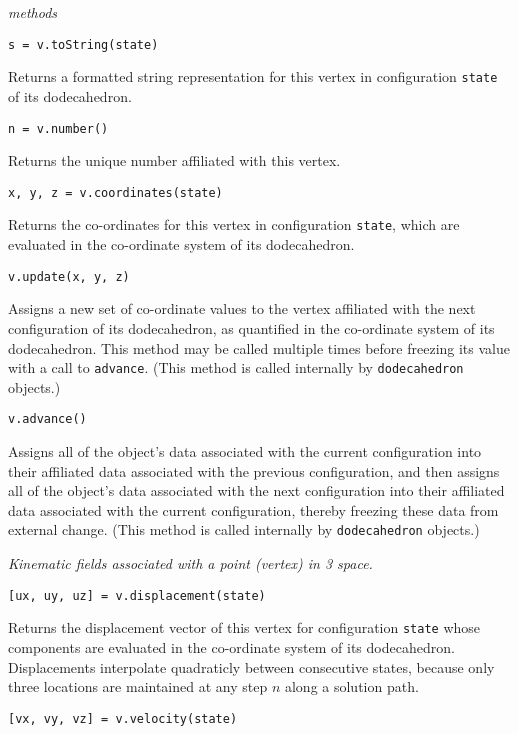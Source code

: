 \medskip\noindent
\textit{methods}

\medskip\noindent
\texttt{s = v.toString(state)}

\medskip\noindent 
Returns a formatted string representation for this vertex in configuration \texttt{state} of its dodecahedron.

\medskip\noindent
\texttt{n = v.number()} 

\medskip\noindent 
Returns the unique number affiliated with this vertex.

\medskip\noindent
\texttt{x, y, z = v.coordinates(state)} 

\medskip\noindent 
Returns the co-ordinates for this vertex in configuration \texttt{state}, which are evaluated in the co-ordinate system of its dodecahedron.

\newpage
\medskip\noindent
\texttt{v.update(x, y, z)} 

\medskip\noindent 
Assigns a new set of co-ordinate values to the vertex affiliated with the next configuration of its dodecahedron, as quantified in the co-ordinate system of its dodecahedron.  This method may be called multiple times before freezing its value with a call to \texttt{advance}.  (This method is called internally by \texttt{dodecahedron} objects.)

\medskip\noindent
\texttt{v.advance()} 

\medskip\noindent 
Assigns all of the object's data associated with the current configuration into their affiliated data associated with the previous configuration, and then assigns all of the object's data associated with the next configuration into their affiliated data associated with the current configuration, thereby freezing these data from external change. (This method is called internally by \texttt{dodecahedron} objects.)

\medskip\noindent
\textit{Kinematic fields associated with a point (vertex) in 3 space.}

\medskip\noindent
\texttt{[ux, uy, uz] = v.displacement(state)} 

\medskip\noindent 
Returns the displacement vector of this vertex for configuration \texttt{state} whose components are evaluated in the co-ordinate system of its dodecahedron.  Displacements interpolate quadraticly between consecutive states, because only three locations are maintained at any step $n$ along a solution path.

\medskip\noindent
\texttt{[vx, vy, vz] = v.velocity(state)} 

